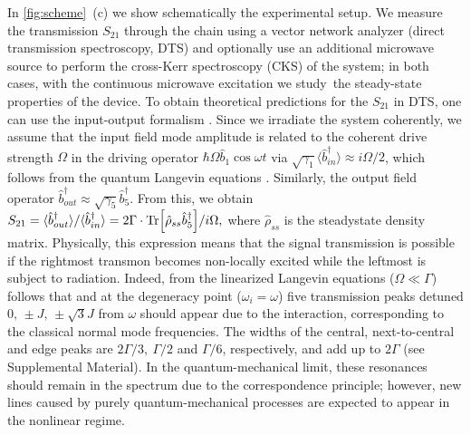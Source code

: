 \documentclass[%
 aps, prl,
 amsmath,amssymb,
 reprint,%
superscriptaddress
]{revtex4-2}
\begin{document}
In \autoref{fig:scheme}~(c) we show schematically the experimental setup. We measure the transmission $S_{21}$ through the chain using a vector network analyzer (direct transmission spectroscopy, DTS) and optionally use an additional microwave source to perform the cross-Kerr spectroscopy (CKS) of the system; in both cases, with the continuous microwave excitation we study the steady-state properties of the device. To obtain theoretical predictions for the $S_{21}$ in DTS, one can use the input-output formalism \cite{yurke1984quantum,gardiner1985input}. Since we irradiate the system coherently, we assume that the input field mode amplitude is related to the coherent drive strength $\Omega$ in the driving operator $\hbar \Omega \hat b_1 \cos \omega t$ via $\sqrt{\gamma_1} \langle  \hat b_{in}^\dag \rangle \approx i \Omega/2$, which follows from the quantum Langevin equations \cite{mirhosseini2019cavity}. Similarly, the output field operator $\hat b_{out}^\dag \approx \sqrt{\gamma_5} \hat b_5^\dag$. From this, we obtain $
	S_{21} = \langle \hat b_{out}^\dag\rangle / \langle \hat b_{in}^\dag \rangle = 2\Gamma\cdot \Tr[\hat \rho_{ss} \hat b_5^\dag]/{i\Omega} ,
$
where $\hat \rho_{ss}$ is the steadystate density matrix. Physically, this expression means that the signal transmission is possible if the rightmost transmon becomes non-locally excited while the leftmost is subject to radiation. Indeed, from the linearized Langevin equations \cite{astafiev2010resonance} ($\Omega \ll \Gamma$) follows that  and at the degeneracy point ($\omega_i = \omega$) five transmission peaks detuned $0,\, \pm J,\, \pm \sqrt{3} J$ from $\omega$ should appear due to the interaction, corresponding to the classical normal mode frequencies. The widths of the central, next-to-central and edge peaks are $2\Gamma/3,\ \Gamma/2$ and $\Gamma/6$, respectively, and add up to $2\Gamma$ (see Supplemental Material).  In the quantum-mechanical limit, these resonances should remain in the spectrum due to the correspondence principle; however, new lines caused by purely quantum-mechanical processes are expected to appear in the nonlinear regime.
\end{document}
